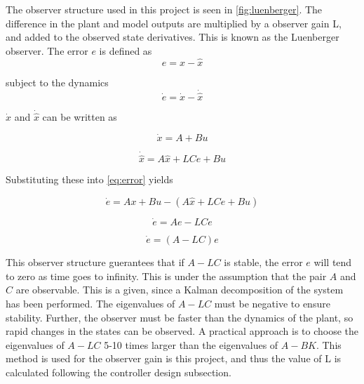 The observer structure used in this project is seen in \cref{fig:luenberger}. The difference in the plant and model outputs are multiplied by a observer gain L, and added to the observed state derivatives. This is known as the Luenberger observer. The error $e$ is defined as
\begin{equation} \label{eq:error}
	e = x-\hat{x}
\end{equation}

subject to the dynamics
\begin{equation}
	\dot{e} = \dot{x}-\dot{\hat{x}}
\end{equation}

$\dot{x}$ and $\dot{\hat{x}}$ can be written as

\begin{equation}
	\dot{x} = A + Bu
\end{equation}


\begin{equation}
	\dot{\hat{x}} = A\hat{x} + LCe + Bu
\end{equation}

Substituting these into \cref{eq:error} yields

\begin{equation}
	\dot{e} = Ax + Bu - ( A\hat{x} + LCe  + Bu)
\end{equation}

\begin{equation}
	\dot{e} = Ae - LCe
\end{equation}

\begin{equation} \label{eq:obs_error_dot}
	\dot{e} = (A - LC)e
\end{equation}

This observer structure guerantees that if $A-LC$ is stable, the error $e$ will tend to zero as time goes to infinity. This is under the assumption that the pair $A$ and $C$ are observable. This is a given, since a Kalman decomposition of the system has been performed. The eigenvalues of $A-LC$ must be negative to ensure stability. Further, the observer must be faster than the dynamics of the plant, so rapid changes in the states can be observed. A practical approach is to choose the eigenvalues of $A-LC$ 5-10 times larger than the eigenvalues of $A-BK$. This method is used for the observer gain is this project, and thus the value of L is calculated following the controller design subsection.



